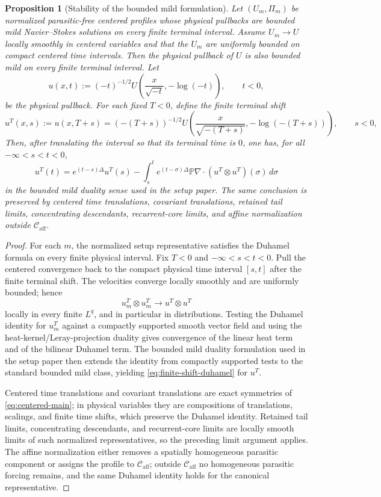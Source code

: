 \documentclass[11pt]{amsart}
\numberwithin{equation}{section}
\theoremstyle{plain}
\newtheorem{proposition}[proposition]{Proposition}
\theoremstyle{definition}
\theoremstyle{remark}
\newcommand{\Caff}{\mathcal C_{\mathrm{aff}}}
\begin{document}
\begin{proposition}[Stability of the bounded mild formulation]
\label{prop:bounded-mild-stability}
Let \((U_m,\Pi_m)\) be normalized parasitic-free centered profiles whose
physical pullbacks are bounded mild Navier--Stokes solutions on every finite
terminal interval.  Assume \(U_m\to U\) locally smoothly in centered variables
and that the \(U_m\) are uniformly bounded on compact centered time intervals.
Then the physical pullback of \(U\) is also bounded mild on every finite
terminal interval.  Let
\[
   u(x,t):=(-t)^{-1/2}
   U\!\left(\frac{x}{\sqrt{-t}},-\log(-t)\right),
   \qquad t<0,
\]
be the physical pullback.  For each fixed \(T<0\), define the finite terminal
shift
\[
   u^T(x,s):=u(x,T+s)
   =
   (-(T+s))^{-1/2}
   U\!\left(\frac{x}{\sqrt{-(T+s)}},-\log (-(T+s))\right),
   \qquad s<0,
\]
Then, after translating the interval so that its terminal time is \(0\), one
has, for all \(-\infty<s<t<0\),
\begin{equation}\label{eq:finite-shift-duhamel}
   u^T(t)=e^{(t-s)\Delta}u^T(s)
   -\int_s^t e^{(t-\sigma)\Delta}
      \mathbb P\nabla\cdot(u^T\otimes u^T)(\sigma)\,d\sigma
\end{equation}
in the bounded mild duality sense used in the setup paper.  The same conclusion is
preserved by centered time translations, covariant translations, retained tail
limits, concentrating descendants, recurrent-core limits, and affine normalization
outside \(\Caff\).
\end{proposition}

\begin{proof}
For each \(m\), the normalized setup representative satisfies the
Duhamel formula on every finite physical interval.  Fix \(T<0\) and
\(-\infty<s<t<0\).  Pull the centered convergence back to the compact physical
time interval \([s,t]\) after the finite terminal shift.  The velocities
converge locally smoothly and are uniformly bounded; hence
\[
   u_m^T\otimes u_m^T\to u^T\otimes u^T
\]
locally in every finite \(L^q\), and in particular in distributions.  Testing
the Duhamel identity for \(u_m^T\) against a compactly supported smooth vector
field and using the heat-kernel/Leray-projection duality gives convergence of
the linear heat term and of the bilinear Duhamel term.  The bounded mild
duality formulation used in the setup paper then extends the identity from
compactly supported tests to the standard bounded mild class, yielding
\eqref{eq:finite-shift-duhamel} for \(u^T\).

Centered time translations and covariant translations are exact symmetries of
\eqref{eq:centered-main}; in physical variables they are compositions of
translations, scalings, and finite time shifts, which preserve the Duhamel
identity.  Retained tail limits, concentrating descendants, and recurrent-core limits
are locally smooth limits of such normalized representatives, so the preceding
limit argument applies.  The affine normalization either removes a spatially
homogeneous parasitic component or assigns the profile to \(\Caff\); outside
\(\Caff\) no homogeneous parasitic forcing remains, and the same Duhamel
identity holds for the canonical representative.
\end{proof}
\end{document}
